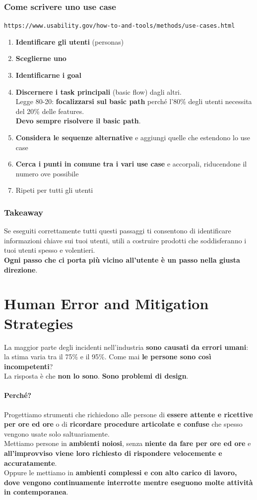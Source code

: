 \documentclass[10pt]{article}
\begin{document}
\subsubsection{Come scrivere uno use case}
\texttt{https://www.usability.gov/how-to-and-tools/methods/use-cases.html}
\begin{enumerate}
\item \textbf{Identificare gli utenti} (personas)
\item \textbf{Sceglierne uno}
\item \textbf{Identificarne i goal}
\item \textbf{Discernere i task principali} (basic flow) dagli altri.\\
Legge 80-20: \textbf{focalizzarsi sul basic path} perché l'80\% degli utenti necessita del 20\% delle features.\\
\textbf{Devo sempre risolvere il basic path}.
\item \textbf{Considera le sequenze alternative} e aggiungi quelle che estendono lo use case
\item \textbf{Cerca i punti in comune tra i vari use case} e accorpali, riducendone il numero ove possibile
\item Ripeti per tutti gli utenti
\end{enumerate}
\subsubsection{Takeaway}
Se eseguiti correttamente tutti questi passaggi ti consentono di identificare informazioni chiave sui tuoi utenti, utili a costruire prodotti che soddisferanno i tuoi utenti spesso e volentieri.\\
\textbf{Ogni passo che ci porta più vicino all'utente è un passo nella giusta direzione}.
\pagebreak
\section{Human Error and Mitigation Strategies}
La maggior parte degli incidenti nell'industria \textbf{sono causati da errori umani}: la stima varia tra il 75\% e il 95\%. Come mai \textbf{le persone sono così incompetenti}?\\
La risposta è che \textbf{non lo sono}. \textbf{Sono problemi di design}.
\paragraph{Perché?} Progettiamo strumenti che richiedono alle persone di \textbf{essere attente e ricettive per ore ed ore} o di \textbf{ricordare procedure articolate e confuse} che spesso vengono usate solo saltuariamente.\\
Mettiamo persone in \textbf{ambienti noiosi}, senza \textbf{niente da fare per ore ed ore} e \textbf{all'improvviso viene loro richiesto di rispondere velocemente e accuratamente}.\\
Oppure le mettiamo in \textbf{ambienti complessi e con alto carico di lavoro, dove vengono continuamente interrotte mentre eseguono molte attività in contemporanea}.
\end{document}
